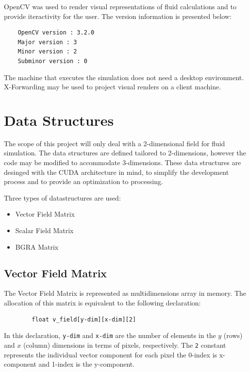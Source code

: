 \documentclass[
10pt, %
letterpaper, %
oneside, %
headinclude,footinclude, %
BCOR5mm, %
]{scrartcl}
\begin{document}
OpenCV was used to render visual representations of fluid calculations and to provide iteractivity for the user. The version information is
presented below:

\begin{verbatim}
    OpenCV version : 3.2.0
    Major version : 3
    Minor version : 2
    Subminor version : 0
\end{verbatim}

The machine that executes the simulation does not need a desktop environment. X-Forwarding may be used to project visual renders on a client
machine.

\section{Data Structures} %
The scope of this project will only deal with a 2-dimensional field for fluid simulation. The data structures are defined tailored to 2-dimensions,
however the code may be modified to accommodate 3-dimensions. These data structures are desinged with the CUDA architecture in mind, to simplify
the development process and to provide an optimization to processing.

Three types of datastructures are used:
\begin{itemize}
    \item Vector Field Matrix
    \item Scalar Field Matrix
    \item BGRA Matrix
\end{itemize}

\subsection{Vector Field Matrix}
The Vector Field Matrix is represented as multidimensions array in memory. The allocation of this matrix is equivalent to the following declaration:
\begin{center}
    \begin{verbatim}
        float v_field[y-dim][x-dim][2]
    \end{verbatim}
\end{center}
In this declaration, \verb|y-dim| and \verb|x-dim| are the number of elements in the $y$ (rows) and $x$ (column) dimensions in terms of pixels, respectively.
The \verb|2| constant represents the individual vector component for each pixel the 0-index is x-component and 1-index is the y-component.
\end{document}
